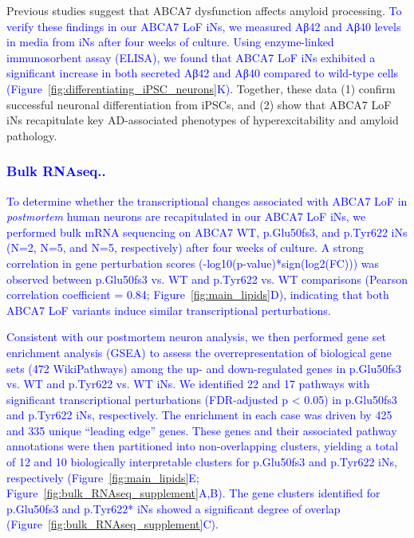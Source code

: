 Previous studies suggest that ABCA7 dysfunction affects amyloid processing\cite{Satoh2015-yu,Sakae2016-uy,Bamji-Mirza2018-xt,Chan2008-qu,De_Roeck2018-zx}. \textcolor{blue}{To verify these findings in our ABCA7 LoF iNs, we measured Aβ42 and Aβ40 levels in media from iNs after four weeks of culture. Using enzyme-linked immunosorbent assay (ELISA), we found that ABCA7 LoF iNs exhibited a significant increase in both secreted Aβ42 and Aβ40 compared to wild-type cells (Figure~\ref{fig:differentiating_iPSC_neurons}K).} Together, these data (1) confirm successful neuronal differentiation from iPSCs, and (2) show that ABCA7 LoF iNs recapitulate key AD-associated phenotypes of hyperexcitability and amyloid pathology.

\subsubsection{\textcolor{blue}{Bulk RNAseq..}}
\textcolor{blue}{To determine whether the transcriptional changes associated with ABCA7 LoF in \emph{postmortem} human neurons are recapitulated in our ABCA7 LoF iNs, we performed bulk mRNA sequencing on ABCA7 WT, p.Glu50fs3, and p.Tyr622 iNs (N=2, N=5, and N=5, respectively) after four weeks of culture. A strong correlation in gene perturbation scores (-log10(p-value)*sign(log2(FC))) was observed between p.Glu50fs3 vs. WT and p.Tyr622 vs. WT comparisons (Pearson correlation coefficient = 0.84; Figure~\ref{fig:main_lipids}D), indicating that both ABCA7 LoF variants induce similar transcriptional perturbations.}

\textcolor{blue}{Consistent with our postmortem neuron analysis, we then performed gene set enrichment analysis (GSEA) to assess the overrepresentation of biological gene sets (472 WikiPathways) among the up- and down-regulated genes in p.Glu50fs3 vs. WT and p.Tyr622 vs. WT iNs. We identified 22 and 17 pathways with significant transcriptional perturbations (FDR-adjusted p < 0.05) in p.Glu50fs3 and p.Tyr622 iNs, respectively. The enrichment in each case was driven by 425 and 335 unique “leading edge” genes\cite{Subramanian2005-pu}. These genes and their associated pathway annotations were then partitioned into non-overlapping clusters, yielding a total of 12 and 10 biologically interpretable clusters for p.Glu50fs3 and p.Tyr622 iNs, respectively (Figure~\ref{fig:main_lipids}E; Figure~\ref{fig:bulk_RNAseq_supplement}A,B). The gene clusters identified for p.Glu50fs3 and p.Tyr622* iNs showed a significant degree of overlap (Figure~\ref{fig:bulk_RNAseq_supplement}C).} 

